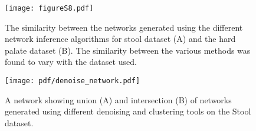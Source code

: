   \begin{figure}[h]
    \centering
    \texttt{[image: figureS8.pdf]}
    \caption{
      The similarity between the networks generated using the different network inference algorithms for stool dataset (A) and the hard palate dataset (B).
      The similarity between the various methods was found to vary with the dataset used.
  }
    \label{fig:figureS8}
  \end{figure}

  \begin{figure}[h]
    \centering
    \texttt{[image: pdf/denoise\_network.pdf]}
    \caption{A network showing union (A) and intersection (B) of networks generated using different denoising and clustering tools on the Stool dataset.}
    \label{fig:figureS5}
  \end{figure}

